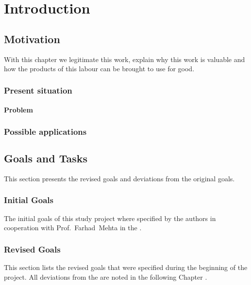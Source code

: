 \chapter{Introduction}
\label{sec:introduction}

\section{Motivation}

With this chapter we legitimate this work, explain why this work is valuable and how the products of this labour can be brought to use for good.

\subsection{Present situation}

\subsubsection{Problem}

\subsection{Possible applications}

\section{Goals and Tasks}
This section presents the revised goals and deviations from the original goals.

\subsection{Initial Goals}
The initial goals of this study project where specified by the authors in cooperation with Prof.~Farhad~Mehta in the . 

\subsection{Revised Goals}
This section lists the revised goals that were specified during the beginning of the project. All deviations from the  are noted in the following Chapter .

